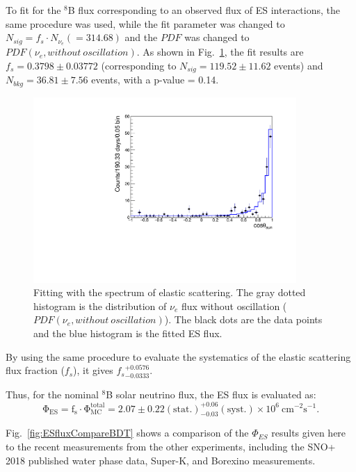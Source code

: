 To fit for the $^8$B flux corresponding to an observed flux of ES interactions, the same procedure was used, while the fit parameter was changed to $N_{sig}=f_s\cdot N_{\nu_e}(=314.68)$ and the $PDF$ was changed to $PDF(\nu_e,without~oscillation)$. As shown in Fig.~\ref{fig:ESfluxFit}, the fit results are $f_s=0.3798\pm 0.03772$ (corresponding to $N_{sig}=119.52\pm11.62$ events) and $N_{bkg}=36.81\pm 7.56$ events, with a p-value = 0.14.

\begin{figure}[!htb]
	\centering
	\includegraphics[width=10cm]{ESfluxFit.pdf}
	\caption[Fitting with the spectrum of elastic scattering.]{Fitting with the spectrum of elastic scattering. The gray dotted histogram is the distribution of $\nu_e$ flux without oscillation ($PDF(\nu_e,without~oscillation)$). The black dots are the data points and the blue histogram is the fitted ES flux.}
	\label{fig:ESfluxFit}
\end{figure}

By using the same procedure to evaluate the systematics of the elastic scattering flux fraction ($f_s$), it gives ${f_s}^{+0.0576}_{-0.0333}$.

Thus, for the nominal $^8$B solar neutrino flux, the ES flux is evaluated as:
\begin{equation}
\mathrm{\Phi_{ES}=f_s\cdot \Phi^{total}_{MC}=2.07\pm 0.22(stat.)^{+0.06}_{-0.03} (syst.)\times 10^6~cm^{-2}s^{-1}}.
\end{equation}

Fig.~\ref{fig:ESfluxCompareBDT} shows a comparison of the $\Phi_{ES}$ results given here to the recent measurements from the other experiments, including the SNO+ 2018 published water phase data\cite{anderson2019measurement}, Super-K\cite{abe2016solar}, and Borexino\cite{agostini2020improved} measurements.

